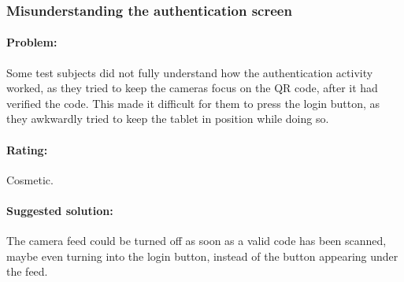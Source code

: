 \subsubsection{Misunderstanding the authentication screen}

\paragraph{Problem:} Some test subjects did not fully understand how the authentication activity worked, as they tried to keep the cameras focus on the QR code, after it had verified the code. This made it difficult for them to press the login button, as they awkwardly tried to keep the tablet in position while doing so. 
\paragraph{Rating:} Cosmetic.
\paragraph{Suggested solution:} The camera feed could be turned off as soon as a valid code has been scanned, maybe even turning into the login button, instead of the button appearing under the feed. 




